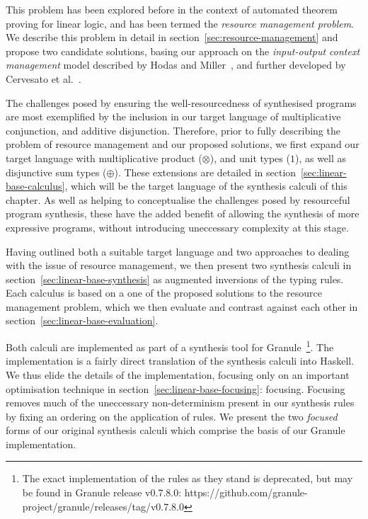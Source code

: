 This problem has been explored before in the context of automated theorem
proving for linear logic, and has been termed the \textit{resource management
problem}. We describe this problem in detail in
section~\ref{sec:resource-management} and propose two candidate solutions,
basing our approach on the \textit{input-output context management} model
described by Hodas and Miller~\cite{HODAS1994327}, and further developed by
Cervesato et al.~\cite{CERVESATO2000133}. 

The challenges posed by ensuring the well-resourcedness of synthesised programs
are most exemplified by the inclusion in our target language of multiplicative
conjunction, and additive disjunction. Therefore, prior to fully describing the
problem of resource management and our proposed solutions, we first expand our
target language with multiplicative product ($\otimes$), and unit types ($1$),
as well as disjunctive sum types ($\oplus$). These extensions are detailed in
section~\ref{sec:linear-base-calculus}, which will be the target language of the
synthesis calculi of this chapter. As well as helping to conceptualise the
challenges posed by resourceful program synthesis, these have the added benefit
of allowing the synthesis of more expressive programs, without introducing
uneccessary complexity at this stage.

Having outlined both a suitable target language and two approaches to dealing
with the issue of resource management, we then present two synthesis calculi in
section~\ref{sec:linear-base-synthesis} as augmented inversions of the typing
rules. Each calculus is based on a one of the proposed solutions to the resource
management problem, which we then evaluate and contrast against each other in
section~\ref{sec:linear-base-evaluation}. 

Both calculi are implemented as part of a synthesis tool for
Granule~\footnote{The exact implementation of the rules as they stand is
deprecated, but may be found in Granule release v0.7.8.0:
https://github.com/granule-project/granule/releases/tag/v0.7.8.0}. The
implementation is a fairly direct translation of the synthesis calculi into
Haskell. We thus elide the details of the implementation, focusing only on an
important optimisation technique in section~\ref{sec:linear-base-focusing}:
focusing. Focusing removes much of the uneccessary non-determinism 
present in our synthesis rules by fixing an ordering on
the application of rules. We present the two \textit{focused} forms of our original
synthesis calculi which comprise the basis of our Granule implementation.

